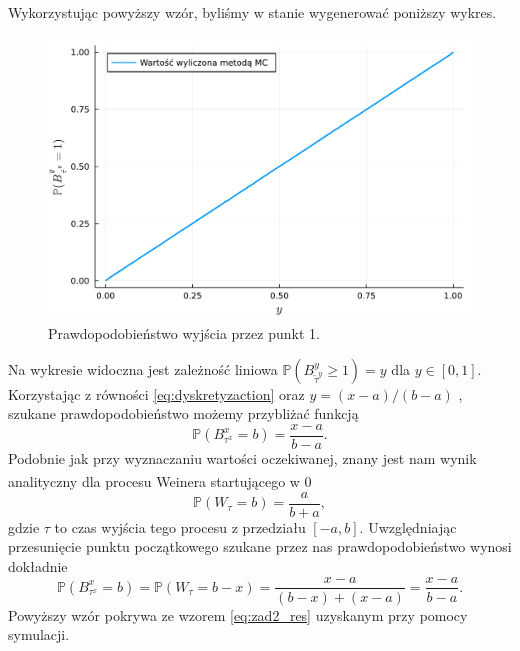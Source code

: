 \documentclass[12pt]{mwart}
\begin{document}
	 Wykorzystując powyższy wzór, byliśmy w stanie wygenerować poniższy wykres.
	\begin{figure}[H]
		\includegraphics[width=\columnwidth]{fig/plot/prob.pdf}
		\caption{Prawdopodobieństwo wyjścia przez punkt 1.}
	\end{figure}
	\noindent Na wykresie widoczna jest zależność liniowa $\mathbb{P}\left(B^y_{\widetilde{\tau}^y}\geqslant1\right) = y$ dla $y\in[0, 1]$. Korzystając z równości \eqref{eq:dyskretyzaction} oraz $y=(x-a)/(b-a)$ , szukane prawdopodobieństwo możemy przybliżać funkcją
	\begin{equation}\label{eq:zad2_res}
		\mathbb{P}\left(B^x_{{\tau}^x}= b\right)=\frac{x-a}{b-a}.
	\end{equation}
	Podobnie jak przy wyznaczaniu wartości oczekiwanej, znany jest nam wynik analityczny\textsuperscript{\cite{art}} dla procesu Weinera startującego w 0
	\begin{equation*}
		\mathbb{P}\left(W_{\tau}=b\right)=\frac{a}{b+a},
	\end{equation*}
	gdzie $\tau$ to czas wyjścia tego procesu z przedziału $[-a, b]$. Uwzględniając przesunięcie punktu początkowego szukane przez nas prawdopodobieństwo wynosi dokładnie
	\begin{equation*}
			\mathbb{P}\left(B^x_{\tau^x}=b\right)=\mathbb{P}\left(W_{\tau}=b-x\right)=\frac{x-a}{(b-x)+(x-a)}=\frac{x-a}{b-a}.
	\end{equation*}
	Powyższy wzór pokrywa ze wzorem \eqref{eq:zad2_res} uzyskanym przy pomocy symulacji.
\end{document}
